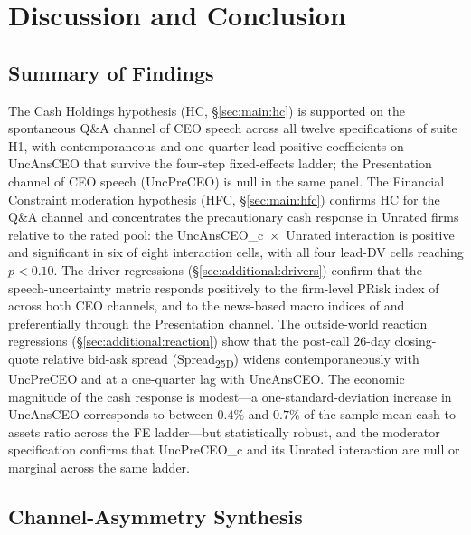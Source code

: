 
\section{Discussion and Conclusion}
\label{sec:conclusion}

\subsection{Summary of Findings}

The Cash Holdings hypothesis (HC, \S\ref{sec:main:hc}) is supported on the spontaneous Q\&A channel of CEO speech across all twelve specifications of suite H1, with contemporaneous and one-quarter-lead positive coefficients on UncAnsCEO that survive the four-step fixed-effects ladder; the Presentation channel of CEO speech (UncPreCEO) is null in the same panel. The Financial Constraint moderation hypothesis (HFC, \S\ref{sec:main:hfc}) confirms HC for the Q\&A channel and concentrates the precautionary cash response in Unrated firms relative to the rated pool: the UncAnsCEO\_c~$\times$~Unrated interaction is positive and significant in six of eight interaction cells, with all four lead-DV cells reaching $p<0.10$. The driver regressions (\S\ref{sec:additional:drivers}) confirm that the speech-uncertainty metric responds positively to the firm-level PRisk index of  across both CEO channels, and to the news-based macro indices of  and  preferentially through the Presentation channel. The outside-world reaction regressions (\S\ref{sec:additional:reaction}) show that the post-call $26$-day closing-quote relative bid-ask spread (Spread\textsubscript{25D}) widens contemporaneously with UncPreCEO and at a one-quarter lag with UncAnsCEO. The economic magnitude of the cash response is modest---a one-standard-deviation increase in UncAnsCEO corresponds to between $0.4\%$ and $0.7\%$ of the sample-mean cash-to-assets ratio across the FE ladder---but statistically robust, and the moderator specification confirms that UncPreCEO\_c and its Unrated interaction are null or marginal across the same ladder.

\subsection{Channel-Asymmetry Synthesis}

